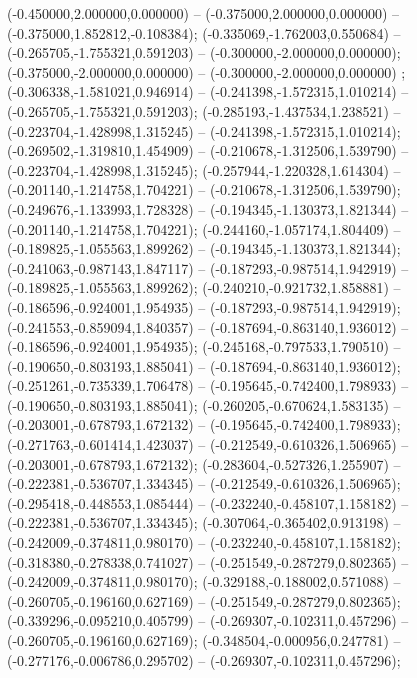  (-0.450000,2.000000,0.000000) -- (-0.375000,2.000000,0.000000) -- (-0.375000,1.852812,-0.108384);
 (-0.335069,-1.762003,0.550684) -- (-0.265705,-1.755321,0.591203) -- (-0.300000,-2.000000,0.000000);
 (-0.375000,-2.000000,0.000000) -- (-0.300000,-2.000000,0.000000) ;
 (-0.306338,-1.581021,0.946914) -- (-0.241398,-1.572315,1.010214) -- (-0.265705,-1.755321,0.591203);
 (-0.285193,-1.437534,1.238521) -- (-0.223704,-1.428998,1.315245) -- (-0.241398,-1.572315,1.010214);
 (-0.269502,-1.319810,1.454909) -- (-0.210678,-1.312506,1.539790) -- (-0.223704,-1.428998,1.315245);
 (-0.257944,-1.220328,1.614304) -- (-0.201140,-1.214758,1.704221) -- (-0.210678,-1.312506,1.539790);
 (-0.249676,-1.133993,1.728328) -- (-0.194345,-1.130373,1.821344) -- (-0.201140,-1.214758,1.704221);
 (-0.244160,-1.057174,1.804409) -- (-0.189825,-1.055563,1.899262) -- (-0.194345,-1.130373,1.821344);
 (-0.241063,-0.987143,1.847117) -- (-0.187293,-0.987514,1.942919) -- (-0.189825,-1.055563,1.899262);
 (-0.240210,-0.921732,1.858881) -- (-0.186596,-0.924001,1.954935) -- (-0.187293,-0.987514,1.942919);
 (-0.241553,-0.859094,1.840357) -- (-0.187694,-0.863140,1.936012) -- (-0.186596,-0.924001,1.954935);
 (-0.245168,-0.797533,1.790510) -- (-0.190650,-0.803193,1.885041) -- (-0.187694,-0.863140,1.936012);
 (-0.251261,-0.735339,1.706478) -- (-0.195645,-0.742400,1.798933) -- (-0.190650,-0.803193,1.885041);
 (-0.260205,-0.670624,1.583135) -- (-0.203001,-0.678793,1.672132) -- (-0.195645,-0.742400,1.798933);
 (-0.271763,-0.601414,1.423037) -- (-0.212549,-0.610326,1.506965) -- (-0.203001,-0.678793,1.672132);
 (-0.283604,-0.527326,1.255907) -- (-0.222381,-0.536707,1.334345) -- (-0.212549,-0.610326,1.506965);
 (-0.295418,-0.448553,1.085444) -- (-0.232240,-0.458107,1.158182) -- (-0.222381,-0.536707,1.334345);
 (-0.307064,-0.365402,0.913198) -- (-0.242009,-0.374811,0.980170) -- (-0.232240,-0.458107,1.158182);
 (-0.318380,-0.278338,0.741027) -- (-0.251549,-0.287279,0.802365) -- (-0.242009,-0.374811,0.980170);
 (-0.329188,-0.188002,0.571088) -- (-0.260705,-0.196160,0.627169) -- (-0.251549,-0.287279,0.802365);
 (-0.339296,-0.095210,0.405799) -- (-0.269307,-0.102311,0.457296) -- (-0.260705,-0.196160,0.627169);
 (-0.348504,-0.000956,0.247781) -- (-0.277176,-0.006786,0.295702) -- (-0.269307,-0.102311,0.457296);
